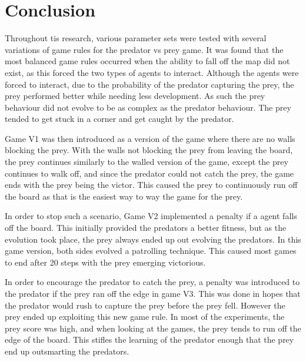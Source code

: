 
\section{Conclusion}

Throughout tis research, various parameter sets were tested with several variations of game rules for the predator vs prey game. It was found that the most balanced game rules occurred when the ability to fall off the map did not exist, as this forced the two types of agents to interact. Although the agents were forced to interact, due to the probability of the predator capturing the prey, the prey performed better while needing less development. As such the prey behaviour did not evolve to be as complex as the predator behaviour. The prey tended to get stuck in a corner and get caught by the predator. 

Game V1 was then introduced as a version of the game where there are no walls blocking the prey. With the walls not blocking the prey from leaving the board, the prey continues similarly to the walled version of the game, except the prey continues to walk off, and since the predator could not catch the prey, the game ends with the prey being the victor. This caused the prey to continuously run off the board as that is the easiest way to way the game for the prey.

In order to stop such a scenario, Game V2 implemented a penalty if a agent falls off the board. This initially provided the predators a better fitness, but as the evolution took place, the prey always ended up out evolving the predators. In this game version, both sides evolved a patrolling technique. This caused most games to end after 20 steps with the prey emerging victorious. 

In order to encourage the predator to catch the prey, a penalty was introduced to the predator if the prey ran off the edge in game V3. This was done in hopes that the predator would rush to capture the prey before the prey fell. However the prey ended up exploiting this new game rule. In most of the experiments, the prey score was high, and when looking at the games, the prey tends to run off the edge of the board. This stifles the learning of the predator enough that the prey end up outsmarting the predators.